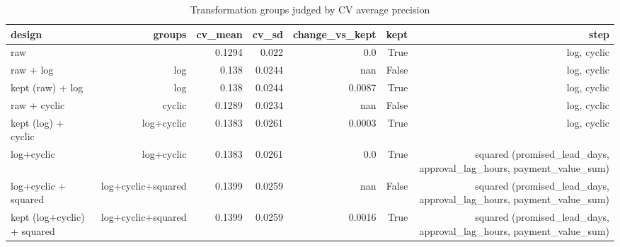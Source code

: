 \begin{table}[htbp]
\centering
\small
\caption{Transformation groups judged by CV average precision}
\begin{tabular}{lrrrrrr}
\toprule
design & groups & cv\_mean & cv\_sd & change\_vs\_kept & kept & step \\
\midrule
raw &  & 0.1294 & 0.022 & 0.0 & True & log, cyclic \\
raw + log & log & 0.138 & 0.0244 & nan & False & log, cyclic \\
kept (raw) + log & log & 0.138 & 0.0244 & 0.0087 & True & log, cyclic \\
raw + cyclic & cyclic & 0.1289 & 0.0234 & nan & False & log, cyclic \\
kept (log) + cyclic & log+cyclic & 0.1383 & 0.0261 & 0.0003 & True & log, cyclic \\
log+cyclic & log+cyclic & 0.1383 & 0.0261 & 0.0 & True & squared (promised\_lead\_days, approval\_lag\_hours, payment\_value\_sum) \\
log+cyclic + squared & log+cyclic+squared & 0.1399 & 0.0259 & nan & False & squared (promised\_lead\_days, approval\_lag\_hours, payment\_value\_sum) \\
kept (log+cyclic) + squared & log+cyclic+squared & 0.1399 & 0.0259 & 0.0016 & True & squared (promised\_lead\_days, approval\_lag\_hours, payment\_value\_sum) \\
\bottomrule
\end{tabular}
\par\smallskip\begin{minipage}{\linewidth}\footnotesize \end{minipage}
\end{table}

